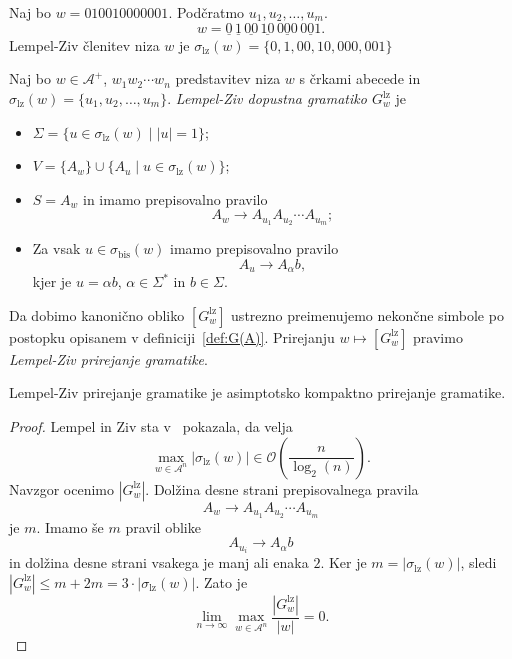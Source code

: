 \documentclass[fin1, tisk]{fmfdelo}
\providecommand{\abs}[1]{\left\lvert #1 \right\rvert}
\newcommand{\A}{\mathcal{A}}
\theoremstyle{definition}
\begin{document}
\begin{primer}\label{primer:LZČlenitev}
    Naj bo $w = 010010000001$. Podčratmo $u_1, u_2, \ldots, u_m$.
    \[
    w = \underline{0} \, \underline{1} \, \underline{00} \, \underline{10} \, \underline{000}
    \, \underline{001}.
    \]
    Lempel-Ziv členitev niza $w$ je $\sigma_{\text{lz}}(w) = \{ 0, 1, 00, 10, 000, 001 \}$
\end{primer}

\begin{definicija}
    Naj bo $w \in \A^+$, $w_1w_2 \cdots w_n$ predstavitev niza $w$ s črkami abecede in 
    $\sigma_\text{lz}(w) = \{ u_1, u_2, \ldots, u_m \}$.
    \emph{Lempel-Ziv dopustna gramatiko $G^\text{lz}_w$} je
    \begin{itemize}
        \item $\Sigma = \{ u \in \sigma_{\text{lz}}(w) \mid \abs{u} = 1 \}$;
        \item $V = \{ A_w \} \cup \{ A_u \mid u \in \sigma_{\text{lz}}(w) \}$;
        \item $S = A_w$ in imamo prepisovalno pravilo 
        \[ 
            A_w \rightarrow A_{u_1}A_{u_2} \cdots A_{u_m};
        \]
        \item Za vsak $u \in \sigma_{\text{bis}}(w)$ imamo prepisovalno pravilo
        \[
            A_u \rightarrow A_{\alpha}b,
        \]
        kjer je $u = \alpha b$, $\alpha \in \Sigma^*$ in $b \in \Sigma$.
    \end{itemize}
    Da dobimo kanonično obliko $[G^\text{lz}_w]$ ustrezno preimenujemo nekončne simbole po
    postopku opisanem v definiciji~\ref{def:G(A)}. Prirejanju $w \mapsto [G^\text{lz}_w]$ pravimo
     \emph{Lempel-Ziv prirejanje gramatike}.
\end{definicija}

\begin{trditev}
    Lempel-Ziv prirejanje gramatike je asimptotsko kompaktno prirejanje gramatike.
\end{trditev}

\begin{proof}
    Lempel in Ziv sta v~\cite{LempelZiv1976} pokazala, da velja
    \[
        \max_{w \in \A^n} \abs{\sigma_\text{lz}(w)} \in \mathcal{O} \left( \frac{n}{\log_2(n)} \right).
    \]
    Navzgor ocenimo $\abs{G^\text{lz}_w}$. Dolžina desne strani prepisovalnega pravila
    \[ 
        A_w \rightarrow A_{u_1}A_{u_2} \cdots A_{u_m}
    \]
    je $m$. Imamo še $m$ pravil oblike
    \[
        A_{u_i} \rightarrow A_{\alpha}b
    \]
    in dolžina desne strani vsakega je manj ali enaka $2$. Ker je $m = \abs{\sigma_\text{lz}(w)}$,
    sledi $\abs{G^\text{lz}_w} \leq m + 2m = 3 \cdot \abs{\sigma_\text{lz}(w)}$. Zato je
    \[
        \lim_{n \rightarrow \infty} \max_{w \in \A^n} \frac{\abs{G^\text{lz}_w}}{\abs{w}} = 0.
    \]
\end{proof}
\end{document}
